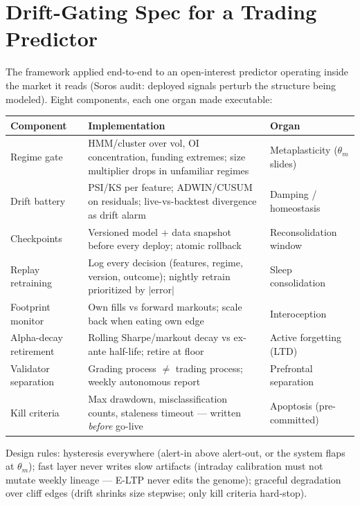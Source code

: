 \documentclass[11pt]{article}
\begin{document}
\appendix
\section{Drift-Gating Spec for a Trading Predictor}
\label{app:drift}

The framework applied end-to-end to an open-interest predictor operating inside the market it reads (Soros audit: deployed signals perturb the structure being modeled). Eight components, each one organ made executable:

\begin{center}
\small
\begin{tabular}{p{2.6cm}p{4.4cm}p{4.6cm}}
\toprule
Component & Implementation & Organ \\
\midrule
Regime gate & HMM/cluster over vol, OI concentration, funding extremes; size multiplier drops in unfamiliar regimes & Metaplasticity ($\theta_m$ slides) \\
Drift battery & PSI/KS per feature; ADWIN/CUSUM on residuals; live-vs-backtest divergence as drift alarm & Damping / homeostasis \\
Checkpoints & Versioned model + data snapshot before every deploy; atomic rollback & Reconsolidation window \\
Replay retraining & Log every decision (features, regime, version, outcome); nightly retrain prioritized by $|$error$|$ & Sleep consolidation \\
Footprint monitor & Own fills vs forward markouts; scale back when eating own edge & Interoception \\
Alpha-decay retirement & Rolling Sharpe/markout decay vs ex-ante half-life; retire at floor & Active forgetting (LTD) \\
Validator separation & Grading process $\neq$ trading process; weekly autonomous report & Prefrontal separation \\
Kill criteria & Max drawdown, misclassification counts, staleness timeout --- written \emph{before} go-live & Apoptosis (pre-committed) \\
\bottomrule
\end{tabular}
\end{center}

Design rules: hysteresis everywhere (alert-in above alert-out, or the system flaps at $\theta_m$); fast layer never writes slow artifacts (intraday calibration must not mutate weekly lineage --- E-LTP never edits the genome); graceful degradation over cliff edges (drift shrinks size stepwise; only kill criteria hard-stop).
\end{document}
